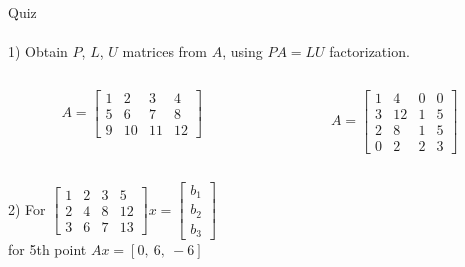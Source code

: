 \documentclass[aspectratio=169]{beamer}
\begin{document}
\begin{frame}[t]{Quiz}
    \framesubtitle{}
    \vspace{-0.3cm}
    1) Obtain $P$, $L$, $U$ matrices from $A$, using $PA=LU$ factorization.
    \begin{columns}[T,onlytextwidth]
        \begin{column}{0.49\textwidth}
            \begin{equation}
                A = \begin{bmatrix}
                    1 & 2  & 3  & 4  \\
                    5 & 6  & 7  & 8  \\
                    9 & 10 & 11 & 12
                \end{bmatrix}
            \end{equation}
        \end{column}
        \begin{column}{0.49\textwidth}
            \begin{equation}
                A = \begin{bmatrix}
                    1 & 4  & 0 & 0 \\
                    3 & 12 & 1 & 5 \\
                    2 & 8  & 1 & 5 \\
                    0 & 2  & 2 & 3
                \end{bmatrix}
            \end{equation}
        \end{column}
    \end{columns}
    \vspace{0.1cm}
\begin{columns}[T,onlytextwidth]
    \begin{column}{0.3\textwidth}
        2) For $\begin{bmatrix}
            1 & 2 & 3 & 5  \\
            2 & 4 & 8 & 12 \\
            3 & 6 & 7 & 13
        \end{bmatrix} x = \begin{bmatrix}b_1\\b_2\\b_3\end{bmatrix}$ \\
        for 5th point $Ax=[0,\ 6,\ -6]$
    \end{column}
    \begin{column}{0.7\textwidth}
        \begin{enumerate}

\end{enumerate}
\end{column}
\end{columns}
\end{frame}
\end{document}
